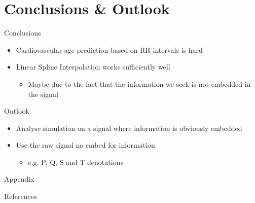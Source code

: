 \documentclass{beamer}
\begin{document}
    \section{Conclusions \& Outlook}
    \begin{frame}{Conclusions}
        \begin{itemize}
            \item Cardiovascular age prediction based on RR intervals is hard
            \item Linear Spline Interpolation works sufficiently well
            \begin{itemize}
                \item Maybe due to the fact that the information we seek is not embedded in the signal
            \end{itemize}
        \end{itemize}
    \end{frame}
    
    \begin{frame}{Outlook}
        \begin{itemize}
            \item Analyse simulation on a signal where information is obviously embedded
            \item Use the raw signal no embed for information
            \begin{itemize}
                \item e.g. P, Q, S and T denotations
            \end{itemize}
        \end{itemize}
    \end{frame}
    
    \appendix
    
    \begin{frame}[standout]{}
        \center Appendix
    \end{frame}
    
    \begin{frame}[allowframebreaks]{References}
    
      
      
    
    \end{frame}
    
\end{document}
